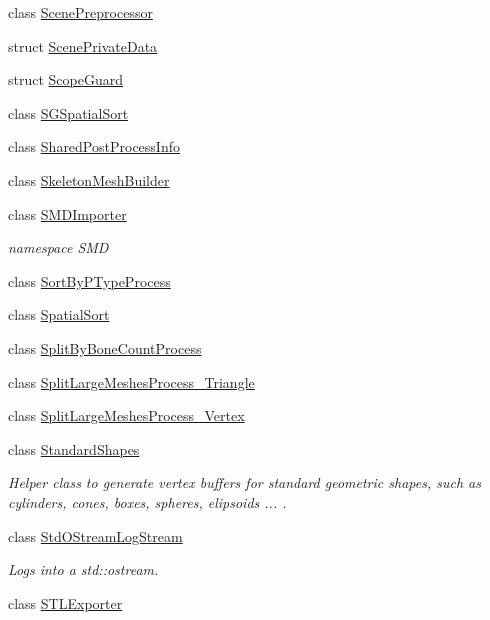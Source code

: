 \begin{DoxyCompactItemize}
class \hyperlink{class_assimp_1_1_scene_preprocessor}{Scene\+Preprocessor}
\item 
struct \hyperlink{struct_assimp_1_1_scene_private_data}{Scene\+Private\+Data}
\item 
struct \hyperlink{struct_assimp_1_1_scope_guard}{Scope\+Guard}
\item 
class \hyperlink{class_assimp_1_1_s_g_spatial_sort}{S\+G\+Spatial\+Sort}
\item 
class \hyperlink{class_assimp_1_1_shared_post_process_info}{Shared\+Post\+Process\+Info}
\item 
class \hyperlink{class_assimp_1_1_skeleton_mesh_builder}{Skeleton\+Mesh\+Builder}
\item 
class \hyperlink{class_assimp_1_1_s_m_d_importer}{S\+M\+D\+Importer}
\begin{DoxyCompactList}\small\item\em namespace S\+M\+D \end{DoxyCompactList}\item 
class \hyperlink{class_assimp_1_1_sort_by_p_type_process}{Sort\+By\+P\+Type\+Process}
\item 
class \hyperlink{class_assimp_1_1_spatial_sort}{Spatial\+Sort}
\item 
class \hyperlink{class_assimp_1_1_split_by_bone_count_process}{Split\+By\+Bone\+Count\+Process}
\item 
class \hyperlink{class_assimp_1_1_split_large_meshes_process___triangle}{Split\+Large\+Meshes\+Process\+\_\+\+Triangle}
\item 
class \hyperlink{class_assimp_1_1_split_large_meshes_process___vertex}{Split\+Large\+Meshes\+Process\+\_\+\+Vertex}
\item 
class \hyperlink{class_assimp_1_1_standard_shapes}{Standard\+Shapes}
\begin{DoxyCompactList}\small\item\em Helper class to generate vertex buffers for standard geometric shapes, such as cylinders, cones, boxes, spheres, elipsoids ... . \end{DoxyCompactList}\item 
class \hyperlink{class_assimp_1_1_std_o_stream_log_stream}{Std\+O\+Stream\+Log\+Stream}
\begin{DoxyCompactList}\small\item\em Logs into a std\+::ostream. \end{DoxyCompactList}\item 
class \hyperlink{class_assimp_1_1_s_t_l_exporter}{S\+T\+L\+Exporter}

\end{DoxyCompactItemize}
